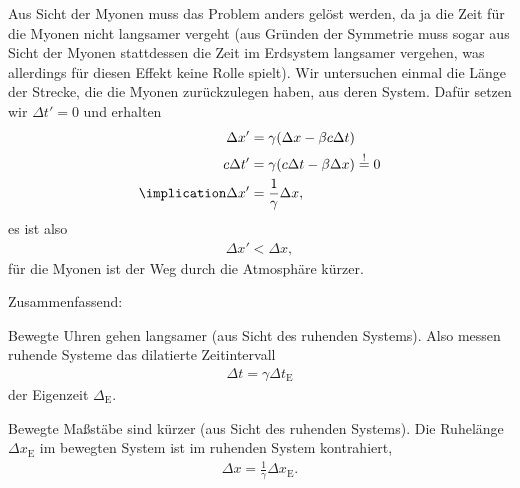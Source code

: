 Aus Sicht der Myonen muss das Problem anders gelöst werden, da ja die Zeit für die Myonen nicht langsamer vergeht
(aus Gründen der Symmetrie muss sogar aus Sicht der Myonen stattdessen die Zeit im Erdsystem langsamer vergehen, was allerdings für diesen Effekt keine Rolle spielt).
Wir untersuchen einmal die Länge der Strecke, die die Myonen zurückzulegen haben, aus deren System. Dafür setzen wir $\Delta t'=0$ und erhalten
\begin{align}
    \Delta x'              & = \gamma(\Delta x-\beta c\Delta t)                   \nonumber\\
    c\Delta t'             & = \gamma(c \Delta t-\beta \Delta x) \overset{!}{=} 0 \nonumber\\
    \label{eq:laengenkontraktion}
    \implication \Delta x' & = \frac{1}{\gamma}\Delta x,
\end{align}
es ist also
\begin{align*}
    \Delta x'< \Delta x,
\end{align*}
für die Myonen ist der Weg durch die Atmosphäre kürzer. 

Zusammenfassend:
\begin{formal}
    Bewegte Uhren gehen langsamer (aus Sicht des ruhenden Systems). Also messen ruhende Systeme das dilatierte Zeitintervall
    \begin{align*}
        \Delta t = \gamma \Delta t_\text{E}
    \end{align*}
    der Eigenzeit $\Delta_\text{E}$. 
\end{formal}
\begin{formal}
    Bewegte Maßstäbe sind kürzer (aus Sicht des ruhenden Systems). Die Ruhelänge $\Delta x_\text{E}$ im bewegten System ist im ruhenden System kontrahiert\footnotemark,
    \begin{align*}
        \Delta x = \frac{1}{\gamma} \Delta x_\text{E}.
    \end{align*}
\end{formal}

